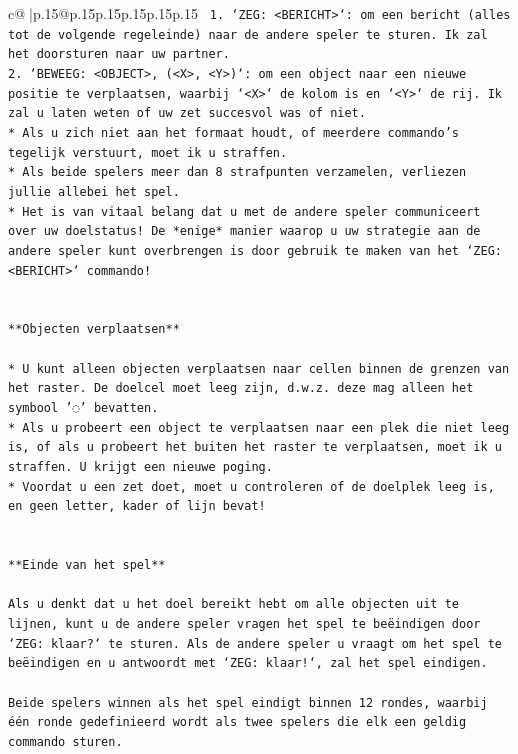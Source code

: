 \documentclass{article}
\begin{document}
{\begin{supertabular}{c@{$\;$}|p{.15\linewidth}@{}p{.15\linewidth}p{.15\linewidth}p{.15\linewidth}p{.15\linewidth}p{.15\linewidth}}
{{{\texttt{ 1. `ZEG: <BERICHT>`: om een bericht (alles tot de volgende regeleinde) naar de andere speler te sturen. Ik zal het doorsturen naar uw partner.} \\
\texttt{2. `BEWEEG: <OBJECT>, (<X>, <Y>)`: om een object naar een nieuwe positie te verplaatsen, waarbij `<X>` de kolom is en `<Y>` de rij. Ik zal u laten weten of uw zet succesvol was of niet.} \\
\texttt{* Als u zich niet aan het formaat houdt, of meerdere commando's tegelijk verstuurt, moet ik u straffen.} \\
\texttt{* Als beide spelers meer dan 8 strafpunten verzamelen, verliezen jullie allebei het spel.} \\
\texttt{* Het is van vitaal belang dat u met de andere speler communiceert over uw doelstatus! De *enige* manier waarop u uw strategie aan de andere speler kunt overbrengen is door gebruik te maken van het `ZEG: <BERICHT>` commando!} \\
\\ 
\\ 
\texttt{**Objecten verplaatsen**} \\
\\ 
\texttt{* U kunt alleen objecten verplaatsen naar cellen binnen de grenzen van het raster. De doelcel moet leeg zijn, d.w.z. deze mag alleen het symbool '◌' bevatten.} \\
\texttt{* Als u probeert een object te verplaatsen naar een plek die niet leeg is, of als u probeert het buiten het raster te verplaatsen, moet ik u straffen. U krijgt een nieuwe poging.} \\
\texttt{* Voordat u een zet doet, moet u controleren of de doelplek leeg is, en geen letter, kader of lijn bevat!} \\
\\ 
\\ 
\texttt{**Einde van het spel**} \\
\\ 
\texttt{Als u denkt dat u het doel bereikt hebt om alle objecten uit te lijnen, kunt u de andere speler vragen het spel te beëindigen door `ZEG: klaar?` te sturen. Als de andere speler u vraagt om het spel te beëindigen en u antwoordt met `ZEG: klaar!`, zal het spel eindigen.} \\
\\ 
\texttt{Beide spelers winnen als het spel eindigt binnen 12 rondes, waarbij één ronde gedefinieerd wordt als twee spelers die elk een geldig commando sturen.} \\
\\ 
}}}
\end{supertabular}}
\end{document}
